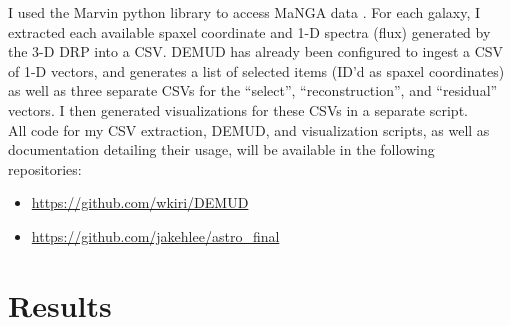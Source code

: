 \documentclass[10pt, letterpaper, notitlepage]{article}
\begin{document}
I used the Marvin python library to access MaNGA data \citep{2018arXiv181203833C}. For each galaxy,
I extracted each available spaxel coordinate and 1-D spectra (flux) generated by the 3-D DRP into a CSV.
DEMUD has already been configured to ingest a CSV of 1-D vectors, and generates a list of selected items
(ID'd as spaxel coordinates) as well as three separate CSVs for the ``select'', ``reconstruction'', and ``residual''
vectors. I then generated visualizations for these CSVs in a separate script.\\

All code for my CSV extraction, DEMUD, and visualization scripts, as well as documentation detailing their usage,
will be available in the following repositories:
\begin{itemize}
	\item \url{https://github.com/wkiri/DEMUD}
	\item \url{https://github.com/jakehlee/astro_final}
\end{itemize}

\section{Results}
\end{document}
